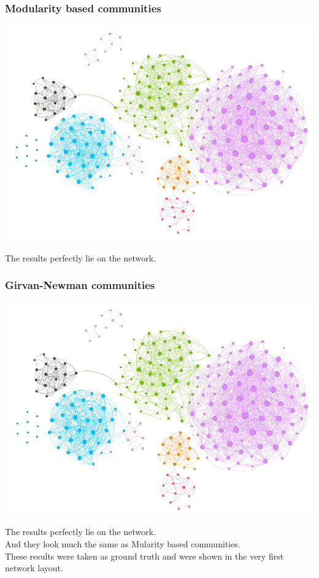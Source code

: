 \documentclass{beamer}
\begin{document}
\begin{frame}
\frametitle{Modularity based communities}
\begin{multicols}{2}
	\includegraphics[width=\columnwidth]{modularity_based_comunity.png}
	\columnbreak
	
	The results perfectly lie on the network.
\end{multicols}

\end{frame}

\begin{frame}
\frametitle{Girvan-Newman communities}
\begin{multicols}{2}
	\includegraphics[width=\columnwidth]{girvan_newman_comunity.png}
	\columnbreak
	
	The results perfectly lie on the network.\\
	And they look much the same as Mularity based communities.\\
	\medskip
		These results were taken as ground truth and were shown in the very first network layout.
\end{multicols}

\end{frame}
\end{document}
